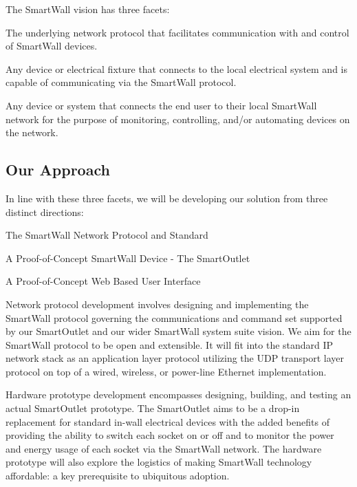 \documentclass[12pt]{article}
\begin{document}
The SmartWall vision has three facets:
\begin{description}
  \setlength{\itemsep}{0pt}
  \setlength{\parskip}{0pt}
  \setlength{\parsep}{0pt}
\item[SmartWall Protocol:] The underlying network protocol that
  facilitates communication with and control of SmartWall devices.
\item[SmartWall Enabled Devices:] Any device or electrical fixture that
  connects to the local electrical system and is capable of
  communicating via the SmartWall protocol.
\item[SmartWall User Interfaces:] Any device or system that connects
  the end user to their local SmartWall network for the purpose of
  monitoring, controlling, and/or automating devices on the network.
\end{description}

\subsection{Our Approach}
In line with these three facets, we will be  developing our solution
from three distinct directions:
\begin{description}
  \setlength{\itemsep}{0pt}
  \setlength{\parskip}{0pt}
  \setlength{\parsep}{0pt}
\item[Network:] The SmartWall Network Protocol and Standard
\item[Hardware:] A Proof-of-Concept SmartWall Device - The SmartOutlet
\item[User Interface:] A Proof-of-Concept Web Based User Interface 
\end{description}

Network protocol development involves designing and implementing the
SmartWall protocol governing the communications and command set supported
by our SmartOutlet and our wider SmartWall system suite
vision. We aim for the SmartWall protocol to be open and
extensible. It will fit into the standard IP network stack as an application
layer protocol utilizing the UDP transport layer protocol on top of a
wired, wireless, or power-line Ethernet implementation.

Hardware prototype development encompasses designing,
building, and testing an actual SmartOutlet prototype. The SmartOutlet
aims to be a drop-in replacement for standard in-wall electrical
devices with the added benefits of providing the ability to switch
each socket on or off and
to monitor the power and energy usage of each socket via the SmartWall
network. The hardware prototype will also explore the logistics of
making SmartWall technology affordable: a key prerequisite to ubiquitous
adoption.
\end{document}
